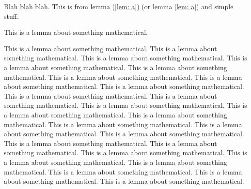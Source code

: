 \documentclass[10pt]{article}
\newcommand{\pref}[1]{{(\ref{#1})}}
\begin{document}
\pagestyle{fancy}
\rfoot{\today}
\renewcommand\headheight{15pt}
\renewcommand\footrulewidth{0.4pt}
\setlength{\parskip}{0pt}
\setlength{\parsep}{0pt}
\setlength{\headsep}{0pt}
\setlength{\topskip}{15pt}
\setlength{\topmargin}{0pt}
\setlength{\topsep}{0pt}
\setlength{\partopsep}{0pt}

\begin{multicols}{2}

    Blah blah blah. This is from lemma \pref{lem: a} (or lemma \ref{lem: a}) and simple stuff.
    
    This is a lemma about something mathematical.

    \label{lem: a}This is a lemma about something mathematical.
    This is a lemma about something mathematical.
    This is a lemma about something mathematical.
    This is a lemma about something mathematical.
    This is a lemma about something mathematical.
    This is a lemma about something mathematical.
    This is a lemma about something mathematical.
    This is a lemma about something mathematical.
    This is a lemma about something mathematical.
    This is a lemma about something mathematical.
    This is a lemma about something mathematical.
    This is a lemma about something mathematical.
    This is a lemma about something mathematical.
    This is a lemma about something mathematical.
    This is a lemma about something mathematical.
    This is a lemma about something mathematical.
    This is a lemma about something mathematical.
    This is a lemma about something mathematical.
    This is a lemma about something mathematical.
    This is a lemma about something mathematical.
    This is a lemma about something mathematical.
    This is a lemma about something mathematical.
    This is a lemma about something mathematical.
    This is a lemma about something mathematical.

% 
% 
\end{multicols}
\end{document}
